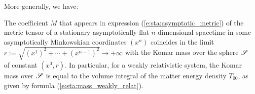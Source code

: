 More generally, we have:

\begin{prop}
\label{p:sta:Komar_mass_asymp_metric}
The coefficient $M$ that appears in expression (\ref{e:sta:asymptotic_metric})
of the metric tensor of a stationary asymptotically flat $n$-dimensional spacetime
in some asymptotically Minkowskian coordinates $(x^\alpha)$
coincides in the limit $r := \sqrt{(x^1)^2 + \cdots + (x^{n-1})^2} \to +\infty$ with
the Komar mass over the sphere $\mathscr{S}$
of constant $(x^0,r)$.
In particular, for a weakly relativistic system, the Komar mass over $\mathscr{S}$ is equal
to the volume integral of the matter energy density $T_{00}$, as given by formula
(\ref{e:sta:mass_weakly_relat}).
\end{prop}

